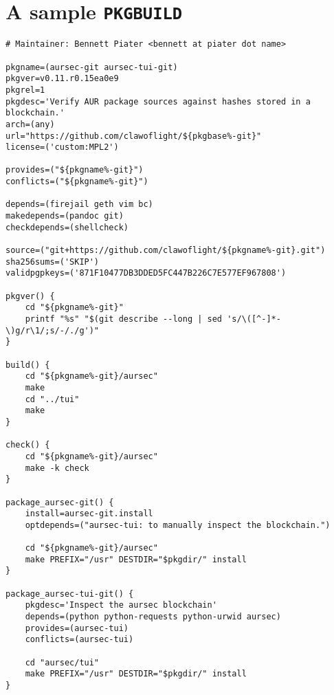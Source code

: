 \section{A sample \texttt{PKGBUILD}}\label{sec:our-pkgbuild}

\begin{verbatim}
# Maintainer: Bennett Piater <bennett at piater dot name>

pkgname=(aursec-git aursec-tui-git)
pkgver=v0.11.r0.15ea0e9
pkgrel=1
pkgdesc='Verify AUR package sources against hashes stored in a blockchain.'
arch=(any)
url="https://github.com/clawoflight/${pkgbase%-git}"
license=('custom:MPL2')

provides=("${pkgname%-git}")
conflicts=("${pkgname%-git}")

depends=(firejail geth vim bc)
makedepends=(pandoc git)
checkdepends=(shellcheck)

source=("git+https://github.com/clawoflight/${pkgname%-git}.git")
sha256sums=('SKIP')
validpgpkeys=('871F10477DB3DDED5FC447B226C7E577EF967808')

pkgver() {
    cd "${pkgname%-git}"
    printf "%s" "$(git describe --long | sed 's/\([^-]*-\)g/r\1/;s/-/./g')"
}

build() {
    cd "${pkgname%-git}/aursec"
    make
    cd "../tui"
    make
}

check() {
    cd "${pkgname%-git}/aursec"
    make -k check
}

package_aursec-git() {
    install=aursec-git.install
    optdepends=("aursec-tui: to manually inspect the blockchain.")

    cd "${pkgname%-git}/aursec"
    make PREFIX="/usr" DESTDIR="$pkgdir/" install
}

package_aursec-tui-git() {
    pkgdesc='Inspect the aursec blockchain'
    depends=(python python-requests python-urwid aursec)
    provides=(aursec-tui)
    conflicts=(aursec-tui)

    cd "aursec/tui"
    make PREFIX="/usr" DESTDIR="$pkgdir/" install
}
\end{verbatim}

